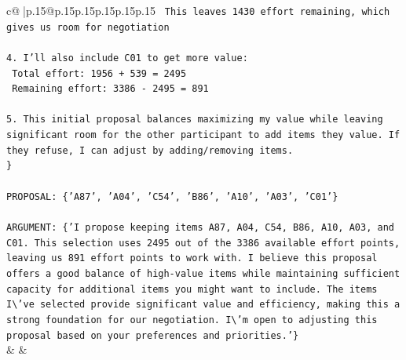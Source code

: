 \documentclass{article}
\begin{document}
{\begin{supertabular}{c@{$\;$}|p{.15\linewidth}@{}p{.15\linewidth}p{.15\linewidth}p{.15\linewidth}p{.15\linewidth}p{.15\linewidth}}
{{{\texttt{   This leaves 1430 effort remaining, which gives us room for negotiation} \\
\\ 
\texttt{4. I'll also include C01 to get more value:} \\
\texttt{   Total effort: 1956 + 539 = 2495} \\
\texttt{   Remaining effort: 3386 {-} 2495 = 891} \\
\\ 
\texttt{5. This initial proposal balances maximizing my value while leaving significant room for the other participant to add items they value. If they refuse, I can adjust by adding/removing items.} \\
\texttt{\}} \\
\\ 
\texttt{PROPOSAL: \{'A87', 'A04', 'C54', 'B86', 'A10', 'A03', 'C01'\}} \\
\\ 
\texttt{ARGUMENT: \{'I propose keeping items A87, A04, C54, B86, A10, A03, and C01. This selection uses 2495 out of the 3386 available effort points, leaving us 891 effort points to work with. I believe this proposal offers a good balance of high{-}value items while maintaining sufficient capacity for additional items you might want to include. The items I\textbackslash{}'ve selected provide significant value and efficiency, making this a strong foundation for our negotiation. I\textbackslash{}'m open to adjusting this proposal based on your preferences and priorities.'\}} \\
            }
        }
    }
    & & \\ \\


\end{supertabular}}
\end{document}

